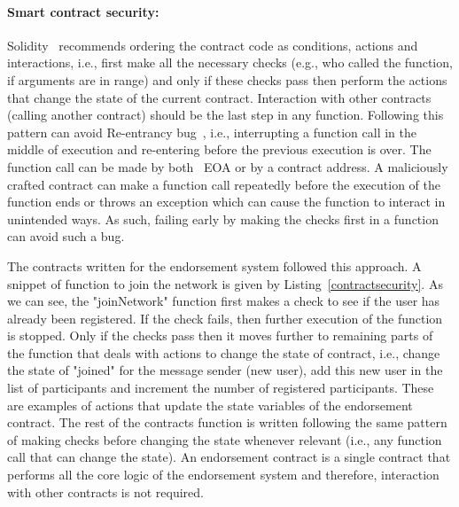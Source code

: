 \paragraph{Smart contract security:} Solidity~\cite{soliditySecurity}
recommends ordering the contract code as conditions, actions and interactions,
i.e., first make all the necessary checks (e.g., who called the function, if
arguments are in range) and only if these checks pass then perform the actions
that change the state of the current contract. Interaction with other contracts
(calling another contract) should be the last step in any function. Following
this pattern can avoid Re-entrancy bug~\cite{atzei2017survey}, i.e.,
interrupting a function call in the middle of execution and re-entering before
the previous execution is over. The function call can be made by both ~\ac{EOA}
or by a contract address. A maliciously crafted contract can make a function
call repeatedly before the execution of the function ends or throws an
exception which can cause the function to interact in unintended ways. As such,
failing early by making the checks first in a function can avoid such a bug. \par
The contracts written for the endorsement system followed this approach. A
snippet of function to join the network is given by
Listing~\ref{contractsecurity}. As we can see, the "joinNetwork" function
first makes a check to see if the user has already been registered. If the
check fails, then further execution of the function is stopped. Only if the
checks pass then it moves further to remaining parts of the function that deals
with actions to change the state of contract, i.e., change the state of
"joined" for the message sender (new user), add this new user in the list of
participants and increment the number of registered participants. These are
examples of actions that update the state variables of the endorsement
contract. The rest of the contracts function is written following the same
pattern of making checks before changing the state whenever relevant (i.e., any
function call that can change the state). An endorsement contract is a single
contract that performs all the core logic of the endorsement system and
therefore, interaction with other contracts is not required. 

